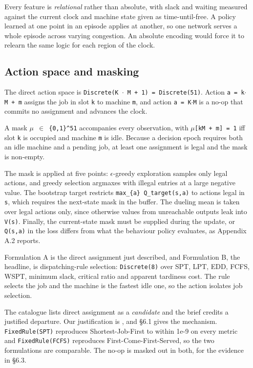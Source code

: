 Every feature is \emph{relational} rather than absolute, with slack and waiting measured against the
current clock and machine state given as time-until-free. A policy learned at one point in an
episode applies at another, so one network serves a whole episode across varying congestion. An
absolute encoding would force it to relearn the same logic for each region of the clock.

\subsection{Action space and masking}\label{action-space-and-masking}

The direct action space is \texttt{Discrete(K\ $\cdot$\ M\ +\ 1)\ =\ Discrete(51)}. Action \texttt{a\ =\ k$\cdot$M\ +\ m} assigns the
job in slot \texttt{k} to machine \texttt{m}, and action \texttt{a\ =\ K$\cdot$M} is a no-op that commits no assignment and
advances the clock.

A mask \texttt{$\mu$\ $\in$\ \{0,1\}\^{}51} accompanies every observation, with \texttt{$\mu${[}kM\ +\ m{]}\ =\ 1} iff slot \texttt{k} is occupied
and machine \texttt{m} is idle. Because a decision epoch requires both an idle machine and a pending job,
at least one assignment is legal and the mask is non-empty.

The mask is applied at five points: $\epsilon$-greedy exploration samples only legal actions, and greedy selection argmaxes with illegal entries at a large negative value. The
bootstrap target restricts \texttt{max\_\{a\textquotesingle{}\}\ Q\_target(s\textquotesingle{},a\textquotesingle{})} to actions legal in \texttt{s\textquotesingle{}}, which requires the
next-state mask in the buffer. The dueling mean is taken over legal actions only, since otherwise
values from unreachable outputs leak into \texttt{V(s)}. Finally, the current-state mask must be supplied
during the update, or \texttt{Q(s,a)} in the loss differs from what the behaviour policy evaluates, as
Appendix A.2 reports.

Formulation A is the direct assignment just described, and Formulation B, the headline, is
dispatching-rule selection: \texttt{Discrete(8)} over SPT, LPT,
EDD, FCFS, WSPT, minimum slack, critical ratio and apparent tardiness cost. The rule selects the
job and the machine is the fastest idle one, so the action isolates job selection.

The catalogue lists direct assignment as a \emph{candidate} and the brief credits a justified departure.
Our justification is \citet{hanyang2020}, and §6.1 gives the mechanism. \texttt{FixedRule(SPT)} reproduces
Shortest-Job-First to within 1e-9 on every metric and \texttt{FixedRule(FCFS)} reproduces
First-Come-First-Served, so the two formulations are comparable. The no-op
is masked out in both, for the evidence in §6.3.

